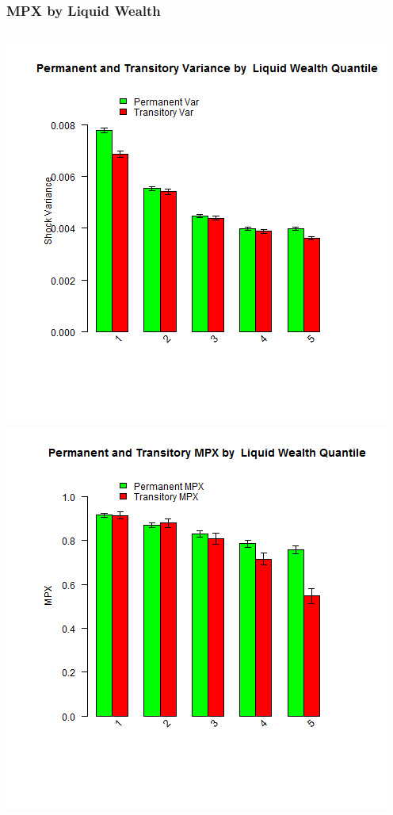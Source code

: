 \documentclass{beamer}
\begin{document}
{
	\frametitle{MPX by Liquid Wealth}
	\begin{columns}
		\centering
		\includegraphics[scale=0.35]{../Figures/VarianceByLiquidWealth.png}
		\centering
		\includegraphics[scale=0.35]{../Figures/MPXByLiquidWealth.png}
	\end{columns} 	
}
\end{document}
